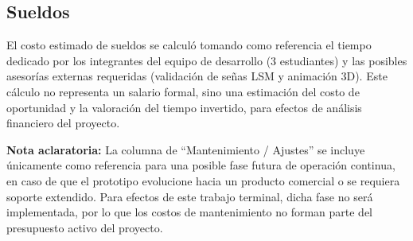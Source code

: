 \newpage
\subsection{Sueldos}

El costo estimado de sueldos se calculó tomando como referencia el tiempo dedicado por los integrantes del equipo de desarrollo (3 estudiantes) y las posibles asesorías externas requeridas (validación de señas LSM y animación 3D). Este cálculo no representa un salario formal, sino una estimación del costo de oportunidad y la valoración del tiempo invertido, para efectos de análisis financiero del proyecto.

\begin{table}[h!]
	\centering
	\renewcommand{\arraystretch}{1.5}
	\setlength{\tabcolsep}{10pt}
	\caption{Costos estimados de sueldos y asesorías para el desarrollo del prototipo}
\end{table}

\noindent \textbf{Nota aclaratoria:}  
La columna de “Mantenimiento / Ajustes” se incluye únicamente como referencia para una posible fase futura de operación continua, en caso de que el prototipo evolucione hacia un producto comercial o se requiera soporte extendido. Para efectos de este trabajo terminal, dicha fase no será implementada, por lo que los costos de mantenimiento no forman parte del presupuesto activo del proyecto.


